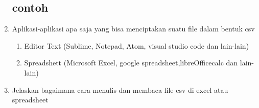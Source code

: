 \documentclass[a4paper, 12pt]{article}
\begin{document}
\begin{enumerate}
\subsection{contoh}

\item Aplikasi-aplikasi apa saja yang bisa menciptakan suatu file dalam bentuk csv
\begin{enumerate}
\item Editor Text (Sublime, Notepad, Atom, visual studio code dan lain-lain) 
\item Spreadshett (Microsoft Excel, google spreadsheet,libreOfficecalc dan lain-lain)
\end{enumerate}
\item Jelaskan bagaimana cara menulis dan membaca file csv di excel atau spreadsheet
\begin{enumerate}

\end{enumerate}
\end{enumerate}
\end{document}
